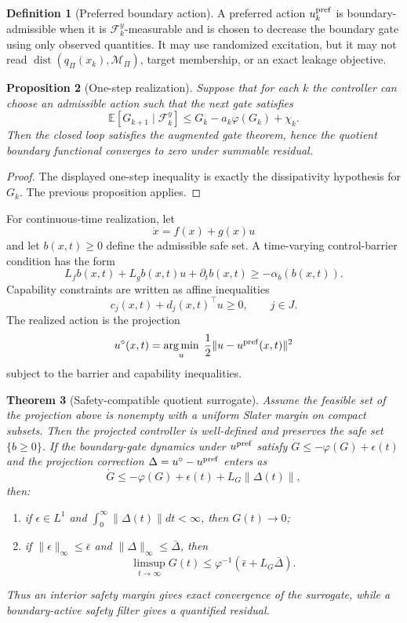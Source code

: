 \documentclass[11pt]{article}
\theoremstyle{definition}
\newtheorem{definition}{Definition}[section]
\theoremstyle{plain}
\newtheorem{theorem}[definition]{Theorem}
\newtheorem{proposition}[definition]{Proposition}
\theoremstyle{remark}
\DeclareMathOperator{\argmin}{arg\,min}
\newcommand{\E}{\mathbb{E}}
\newcommand{\cF}{\mathcal{F}}
\newcommand{\cM}{\mathcal{M}}
\begin{document}
\begin{definition}[Preferred boundary action]
A preferred action $u_k^{\rm pref}$ is boundary-admissible when it is $\cF_k^y$-measurable and is chosen to decrease the boundary gate using only observed quantities. It may use randomized excitation, but it may not read $\operatorname{dist}(q_\Pi(x_k),\cM_\Pi)$, target membership, or an exact leakage objective.
\end{definition}

\begin{proposition}[One-step realization]
Suppose that for each $k$ the controller can choose an admissible action such that the next gate satisfies
\[
    \E[G_{k+1}\mid\cF_k^y]\le G_k-a_k\varphi(G_k)+\chi_k.
\]
Then the closed loop satisfies the augmented gate theorem, hence the quotient boundary functional converges to zero under summable residual.
\end{proposition}

\begin{proof}
The displayed one-step inequality is exactly the dissipativity hypothesis for $G_k$. The previous proposition applies.
\end{proof}

For continuous-time realization, let
\[
    \dot x=f(x)+g(x)u
\]
and let $b(x,t)\ge0$ define the admissible safe set. A time-varying control-barrier condition has the form
\[
    L_f b(x,t)+L_g b(x,t)u+\partial_t b(x,t)\ge -\alpha_b(b(x,t)).
\]
Capability constraints are written as affine inequalities
\[
    c_j(x,t)+d_j(x,t)^\top u\ge0,
    \qquad j\in J.
\]
The realized action is the projection
\[
    u^\circ(x,t)=\argmin_{u}\;\frac12\|u-u^{\rm pref}(x,t)\|^2
\]
subject to the barrier and capability inequalities.

\begin{theorem}[Safety-compatible quotient surrogate]
Assume the feasible set of the projection above is nonempty with a uniform Slater margin on compact subsets. Then the projected controller is well-defined and preserves the safe set $\{b\ge0\}$. If the boundary-gate dynamics under $u^{\rm pref}$ satisfy $\dot G\le-\varphi(G)+\epsilon(t)$ and the projection correction $\Delta=u^\circ-u^{\rm pref}$ enters as
\[
    \dot G\le-\varphi(G)+\epsilon(t)+L_G\|\Delta(t)\|,
\]
then:
\begin{enumerate}[leftmargin=2em]
    \item if $\epsilon\in L^1$ and $\int_0^\infty\|\Delta(t)\|dt<\infty$, then $G(t)\to0$;
    \item if $\|\epsilon\|_\infty\le\bar\epsilon$ and $\|\Delta\|_\infty\le\bar\Delta$, then
    \[
        \limsup_{t\to\infty}G(t)\le \varphi^{-1}(\bar\epsilon+L_G\bar\Delta).
    \]
\end{enumerate}
Thus an interior safety margin gives exact convergence of the surrogate, while a boundary-active safety filter gives a quantified residual.
\end{theorem}
\end{document}

